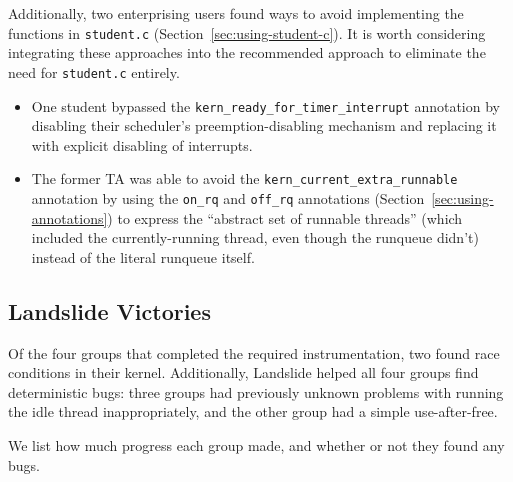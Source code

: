 Additionally, two enterprising users found ways to avoid implementing the functions in \texttt{student.c} (Section~\ref{sec:using-student-c}). It is worth considering integrating these approaches into the recommended approach to eliminate the need for \texttt{student.c} entirely.
\begin{itemize}
	\item One student bypassed the \texttt{kern\_ready\_for\_timer\_interrupt} annotation by disabling their scheduler's preemption-disabling mechanism and replacing it with explicit disabling of interrupts. 
	\item The former TA was able to avoid the \texttt{kern\_current\_extra\_runnable} annotation by using the \texttt{on\_rq} and \texttt{off\_rq} annotations (Section~\ref{sec:using-annotations}) to express the ``abstract set of runnable threads'' (which included the currently-running thread, even though the runqueue didn't) instead of the literal runqueue itself. 
\end{itemize}

\subsection{Landslide Victories}
\label{sec:eval-victory}

Of the four groups that completed the required instrumentation, two found race conditions in their kernel. Additionally, Landslide helped all four groups find deterministic bugs: three groups had previously unknown problems with running the idle thread inappropriately, and the other group had a simple use-after-free.

We list how much progress each group made, and whether or not they found any bugs.

